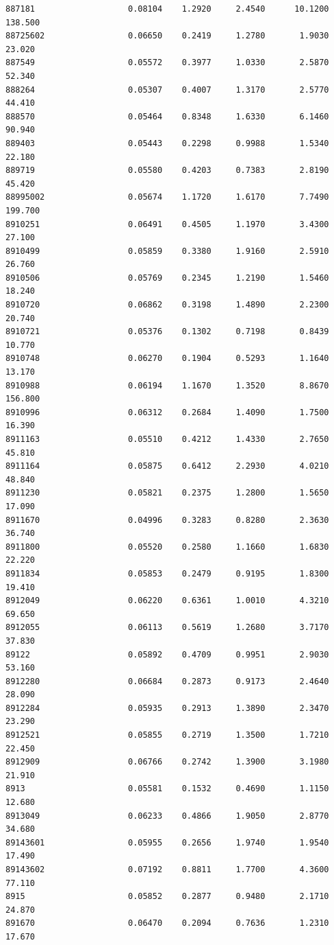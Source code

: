 \documentclass[
  letterpaper,
  DIV=11,
  numbers=noendperiod]{scrartcl}
\begin{document}
\begin{verbatim}
887181                   0.08104    1.2920     2.4540      10.1200 138.500
88725602                 0.06650    0.2419     1.2780       1.9030  23.020
887549                   0.05572    0.3977     1.0330       2.5870  52.340
888264                   0.05307    0.4007     1.3170       2.5770  44.410
888570                   0.05464    0.8348     1.6330       6.1460  90.940
889403                   0.05443    0.2298     0.9988       1.5340  22.180
889719                   0.05580    0.4203     0.7383       2.8190  45.420
88995002                 0.05674    1.1720     1.6170       7.7490 199.700
8910251                  0.06491    0.4505     1.1970       3.4300  27.100
8910499                  0.05859    0.3380     1.9160       2.5910  26.760
8910506                  0.05769    0.2345     1.2190       1.5460  18.240
8910720                  0.06862    0.3198     1.4890       2.2300  20.740
8910721                  0.05376    0.1302     0.7198       0.8439  10.770
8910748                  0.06270    0.1904     0.5293       1.1640  13.170
8910988                  0.06194    1.1670     1.3520       8.8670 156.800
8910996                  0.06312    0.2684     1.4090       1.7500  16.390
8911163                  0.05510    0.4212     1.4330       2.7650  45.810
8911164                  0.05875    0.6412     2.2930       4.0210  48.840
8911230                  0.05821    0.2375     1.2800       1.5650  17.090
8911670                  0.04996    0.3283     0.8280       2.3630  36.740
8911800                  0.05520    0.2580     1.1660       1.6830  22.220
8911834                  0.05853    0.2479     0.9195       1.8300  19.410
8912049                  0.06220    0.6361     1.0010       4.3210  69.650
8912055                  0.06113    0.5619     1.2680       3.7170  37.830
89122                    0.05892    0.4709     0.9951       2.9030  53.160
8912280                  0.06684    0.2873     0.9173       2.4640  28.090
8912284                  0.05935    0.2913     1.3890       2.3470  23.290
8912521                  0.05855    0.2719     1.3500       1.7210  22.450
8912909                  0.06766    0.2742     1.3900       3.1980  21.910
8913                     0.05581    0.1532     0.4690       1.1150  12.680
8913049                  0.06233    0.4866     1.9050       2.8770  34.680
89143601                 0.05955    0.2656     1.9740       1.9540  17.490
89143602                 0.07192    0.8811     1.7700       4.3600  77.110
8915                     0.05852    0.2877     0.9480       2.1710  24.870
891670                   0.06470    0.2094     0.7636       1.2310  17.670

\end{verbatim}
\end{document}
